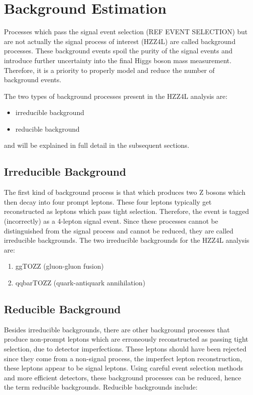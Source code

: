 \section{Background Estimation}
\label{sec:bkg_estim}

Processes which pass the signal event selection (REF EVENT SELECTION) but are not actually the signal process of interest (HZZ4L) are called background processes.
These background events spoil the purity of the signal events and introduce further uncertainty into the final Higgs boson mass measurement.
Therefore, it is a priority to properly model and reduce the number of background events.

The two types of background processes present in the HZZ4L analysis are:

\begin{itemize}
    \item irreducible background
    \item reducible background
\end{itemize}

and will be explained in full detail in the subsequent sections.

\subsection{Irreducible Background}
\label{sec:bkg_irred}

The first kind of background process is that which produces two Z bosons which then decay into four prompt leptons.
These four leptons typically get reconstructed as leptons which pass tight selection.
Therefore, the event is tagged (incorrectly) as a 4-lepton signal event.
Since these processes cannot be distinguished from the signal process and cannot be reduced, they are called irreducible backgrounds.
The two irreducible backgrounds for the HZZ4L analysis are:

\begin{enumerate}
    \item ggTOZZ (gluon-gluon fusion)
    \item qqbarTOZZ (quark-antiquark annihilation)
\end{enumerate}

\subsection{Reducible Background}
\label{sec:bkg_red}

Besides irreducible backgrounds, there are other background processes that produce non-prompt leptons which are erroneously reconstructed as passing tight selection, due to detector imperfections.
These leptons should have been rejected since they come from a non-signal process, the imperfect lepton reconstruction, these leptons appear to be signal leptons.
Using careful event selection methods and more efficient detectors, these background processes can be reduced, hence the term reducible backgrounds.
Reducible backgrounds include:

